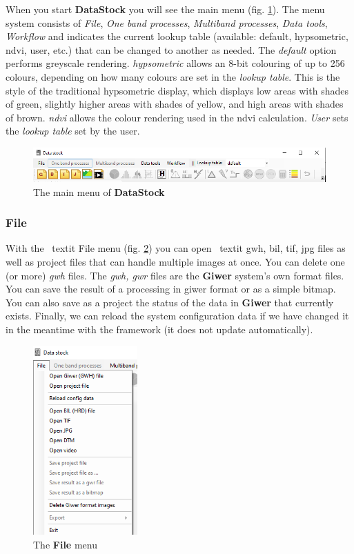 \documentclass[a4paper,12pt]{article}
\begin{document}
When you start \textbf{DataStock} you will see the main menu (fig. \ref{fig:datastock_mainmenu}). The menu system consists of \textit {File}, \textit {One band processes}, \textit {Multiband processes}, \textit {Data tools}, \textit{Workflow} and indicates the current lookup table (available: default, hypsometric, ndvi, user, etc.) that can be changed to another as needed. The \textit {default} option performs greyscale rendering. \textit {hypsometric} allows an 8-bit colouring of up to 256 colours, depending on how many colours are set in the \textit {lookup table}. This is the style of the traditional hypsometric display, which displays low areas with shades of green, slightly higher areas with shades of yellow, and high areas with shades of brown. \textit {ndvi} allows the colour rendering used in the ndvi calculation. \textit {User} sets the \textit {lookup table} set by the user. 

\begin{figure}
	\centering
	\includegraphics[width=14cm]{datastock_mainmenu.png}
	\caption{The main menu of \textbf{DataStock}}
	\label{fig:datastock_mainmenu}
\end{figure}


\subsubsection{File}

With the \ textit {File} menu (fig. \ref {fig:filemenu_datastock}) you can open \ textit {gwh, bil, tif, jpg} files as well as project files that can handle multiple images at once. You can delete one (or more) \textit {gwh} files. The \textit {gwh, gwr} files are the \textbf {Giwer} system's own format files. You can save the result of a processing in giwer format or as a simple bitmap. You can also save as a project the status of the data in \textbf {Giwer} that currently exists. Finally, we can reload the system configuration data if we have changed it in the meantime with the framework (it does not update automatically). 

\begin{figure}
	\centering
	\includegraphics[width=4cm]{filemenu_datastock.png}
	\caption{The \textbf{File} menu}
	\label{fig:filemenu_datastock}
\end{figure}
\end{document}
